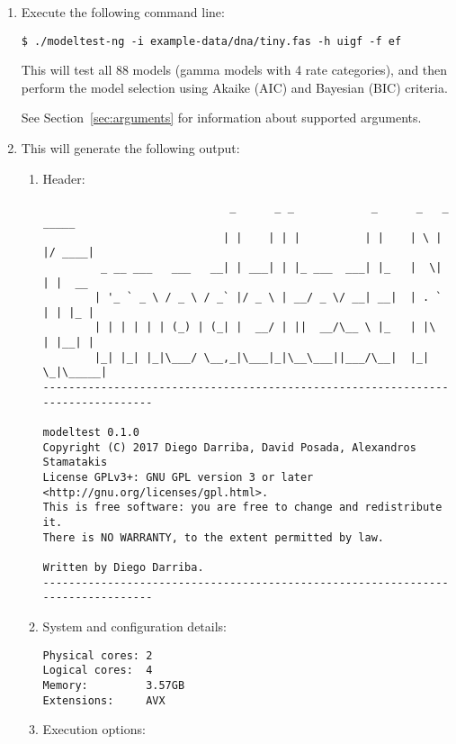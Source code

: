 \begin{enumerate}
\item Execute the following command line:

\begin{lstlisting}
$ ./modeltest-ng -i example-data/dna/tiny.fas -h uigf -f ef
\end{lstlisting}

This will test all 88 models (gamma models with 4 rate categories), and then perform the model selection using Akaike (AIC) and Bayesian (BIC) criteria.

See Section~\ref{sec:arguments} for information about supported arguments.

\item This will generate the following output:

\begin{enumerate}

\item Header:

\begin{lstlisting}
                             _      _ _            _      _   _  _____ 
                            | |    | | |          | |    | \ | |/ ____|
         _ __ ___   ___   __| | ___| | |_ ___  ___| |_   |  \| | |  __ 
        | '_ ` _ \ / _ \ / _` |/ _ \ | __/ _ \/ __| __|  | . ` | | |_ |
        | | | | | | (_) | (_| |  __/ | ||  __/\__ \ |_   | |\  | |__| |
        |_| |_| |_|\___/ \__,_|\___|_|\__\___||___/\__|  |_| \_|\_____|
--------------------------------------------------------------------------------

modeltest 0.1.0
Copyright (C) 2017 Diego Darriba, David Posada, Alexandros Stamatakis
License GPLv3+: GNU GPL version 3 or later <http://gnu.org/licenses/gpl.html>.
This is free software: you are free to change and redistribute it.
There is NO WARRANTY, to the extent permitted by law.

Written by Diego Darriba.
--------------------------------------------------------------------------------
\end{lstlisting}

\item System and configuration details:

\begin{lstlisting}
Physical cores: 2
Logical cores:  4
Memory:         3.57GB
Extensions:     AVX

\end{lstlisting}

\item Execution options:


\end{enumerate}
\end{enumerate}
